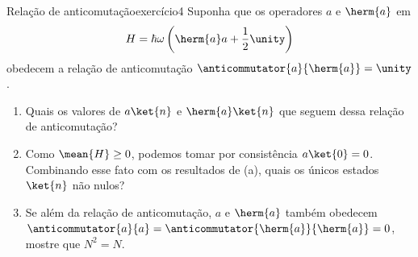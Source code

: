 \begin{exercício}{Relação de anticomutação}{exercício4}
    Suponha que os operadores \(a\) e \(\herm{a}\) em
    \begin{equation*}
        H = \hbar \omega \left(\herm{a}a + \frac12\unity\right)
    \end{equation*}
    obedecem a relação de anticomutação \(\anticommutator{a}{\herm{a}} = \unity\).
    \begin{enumerate}[label=(\alph*)]
        \item Quais os valores de \(a\ket{n}\) e \(\herm{a}\ket{n}\) que seguem dessa relação de anticomutação?
        \item Como \(\mean{H} \geq 0\), podemos tomar por consistência \(a\ket{0} = 0\). Combinando esse fato com os resultados de (a), quais os únicos estados \(\ket{n}\) não nulos?
        \item Se além da relação de anticomutação, \(a\) e \(\herm{a}\) também obedecem \(\anticommutator{a}{a} = \anticommutator{\herm{a}}{\herm{a}} = 0\), mostre que \(N^2 = N\).
    \end{enumerate}
\end{exercício}
